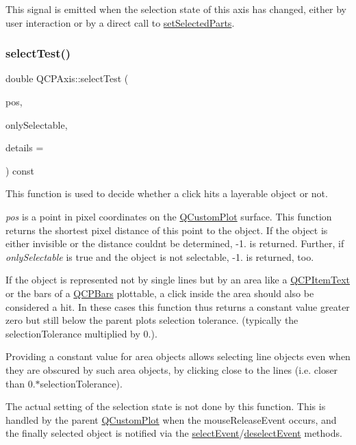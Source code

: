 This signal is emitted when the selection state of this axis has changed, either by user interaction or by a direct call to \hyperlink{class_q_c_p_axis_ab9d7a69277dcbed9119b3c1f25ca19c3}{set\+Selected\+Parts}. \mbox{\label{class_q_c_p_axis_a63b7103c57fe9acfbce164334ea837f8}} 
\subsubsection{\texorpdfstring{select\+Test()}{selectTest()}}
{\footnotesize\ttfamily double Q\+C\+P\+Axis\+::select\+Test (\begin{DoxyParamCaption}\item[{const Q\+PointF \&}]{pos,  }\item[{bool}]{only\+Selectable,  }\item[{Q\+Variant $\ast$}]{details = {} }\end{DoxyParamCaption}) const\hspace{0.3cm}{\ttfamily [virtual]}}

This function is used to decide whether a click hits a layerable object or not.

{\itshape pos} is a point in pixel coordinates on the \hyperlink{class_q_custom_plot}{Q\+Custom\+Plot} surface. This function returns the shortest pixel distance of this point to the object. If the object is either invisible or the distance couldn\textquotesingle{}t be determined, -\/1. is returned. Further, if {\itshape only\+Selectable} is true and the object is not selectable, -\/1. is returned, too.

If the object is represented not by single lines but by an area like a \hyperlink{class_q_c_p_item_text}{Q\+C\+P\+Item\+Text} or the bars of a \hyperlink{class_q_c_p_bars}{Q\+C\+P\+Bars} plottable, a click inside the area should also be considered a hit. In these cases this function thus returns a constant value greater zero but still below the parent plot\textquotesingle{}s selection tolerance. (typically the selection\+Tolerance multiplied by 0.).

Providing a constant value for area objects allows selecting line objects even when they are obscured by such area objects, by clicking close to the lines (i.\+e. closer than 0.$\ast$selection\+Tolerance).

The actual setting of the selection state is not done by this function. This is handled by the parent \hyperlink{class_q_custom_plot}{Q\+Custom\+Plot} when the mouse\+Release\+Event occurs, and the finally selected object is notified via the \hyperlink{class_q_c_p_axis_a50c3ed18e189d48421ec2978f88e4f87}{select\+Event}/\hyperlink{class_q_c_p_axis_a5bc1f8a8d0fbc7658eba70c80279ed31}{deselect\+Event} methods.


